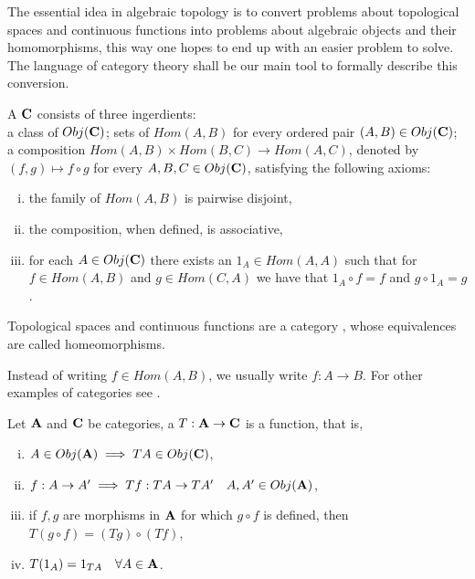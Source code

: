 \documentclass[../1.tex]{subfiles}
\begin{document}
    The essential idea in algebraic topology is to convert problems about topological spaces and continuous functions into
    problems about algebraic objects and their homomorphisms, this way one hopes to end up with an easier problem to solve. 
    The language of category theory shall be our main tool to formally describe this conversion.

    \begin{defn}
        A  $\textbf{C}$ consists of three ingerdients:\\
        a class of  $Obj(\textbf{C})$; sets of 
        $Hom(A,B)$ for every ordered pair $(A,B) \in Obj(\textbf{C})$; a composition $Hom(A,B) \times Hom(B,C) \to Hom(A,C)$, denoted
        by $(f,g) \mapsto f \circ g$ for every $A,B,C \in Obj(\textbf{C})$, satisfying the following axioms:
        \begin{enumerate}[(i)]
            \item the family of $Hom(A,B)$ is pairwise disjoint,
            \item the composition, when defined, is associative,
            \item for each $A \in Obj(\textbf{C})$ there exists an  $1_A \in Hom(A,A)$ such that for $f \in Hom(A,B)$ and $g \in Hom(C,A)$
                  we have that $1_A \circ f = f$ and $g \circ 1_A = g$.
        \end{enumerate}
    \end{defn}

    \begin{thm}
        Topological spaces and continuous functions are a category , whose equivalences are called homeomorphisms.
    \end{thm}

    Instead of writing $f \in Hom(A,B)$, we usually write $f : A \to B$. For other examples of categories see \cite{rotman}.

    \begin{defn}
        Let $\textbf{A}$ and $\textbf{C}$ be categories, a  $T : \textbf{A} \to \textbf{C}$ is a function, that is, 
        \begin{enumerate}[(i)]
            \item $A \in Obj(\textbf{A}) \implies TA \in Obj(\textbf{C})$,
            \item $f:A \to A' \implies Tf: TA \to TA' \quad A,A' \in Obj(\textbf{A})$,
            \item if $f,g$ are morphisms in $\textbf{A}$ for which $g \circ f$ is defined, then $T(g \circ f) = (Tg) \circ (Tf)$,
            \item $T(1_A)= 1_{TA} \quad \forall A \in \textbf{A}$.
        \end{enumerate}
    \end{defn}
\end{document}
